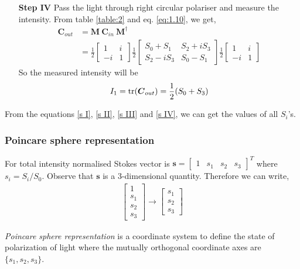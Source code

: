 \documentclass[11pt,a4paper]{article}
\numberwithin{equation}{section}
\begin{document}
\begin{enumerate}
  \item[\textbf{Step IV}] 
 Pass the light through right circular polariser and measure the intensity. From table \ref{table:2} and eq. \ref{eq:1.10}, we get,
 \begin{align}
 	\boldsymbol{C}_{out} &= \boldsymbol{M}\:\boldsymbol{C}_{in}\:\boldsymbol{M}^\dagger\nonumber\\
 	&=\frac{1}{2}\begin{bmatrix} 1 & i \\ -i & 1 \end{bmatrix} 
 	\frac{1}{2} \begin{bmatrix} S_0+S_1 & S_2+iS_3 \\ S_2-iS_3 & S_0-S_1\end{bmatrix}
 	\frac{1}{2}\begin{bmatrix} 1 & i \\ -i & 1 \end{bmatrix}
 \end{align}
 So the measured intensity will be 
 \begin{align}
 	I_1 = \tr(\boldsymbol{C}_{out}) = \frac{1}{2} (S_0+S_3) \label{s IV}
 \end{align}
 \end{enumerate}

From the equations \ref{s I}, \ref{s II}, \ref{s III} and \ref{s IV}, we can get the values of all $S_i$'s.
\subsubsection{Poincare sphere representation}
For total intensity normalised Stokes vector is $\boldsymbol{s}= \begin{bmatrix} 1& s_1& s_2& s_3\end{bmatrix}^T$ where $s_i=S_i/S_0$. Observe that $ \boldsymbol{s} $ is a 3-dimensional quantity. Therefore we can write, 
\begin{align*}
	\begin{bmatrix} 1\\ s_1\\ s_2\\ s_3\end{bmatrix} \rightarrow 
	\begin{bmatrix} s_1\\ s_2\\ s_3\end{bmatrix}
\end{align*}

\textit{Poincare sphere representation} is a coordinate system to define the state of polarization of light where the mutually orthogonal coordinate axes are $\{ s_1, s_2, s_3 \}$.
\begin{center}
	\label{fig:poincare}
\end{center}
\end{document}
